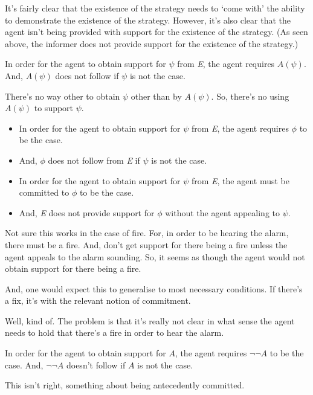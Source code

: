 \documentclass[10pt]{article}
\begin{document}
\begin{note}
  It's fairly clear that the existence of the strategy needs to `come with' the ability to demonstrate the existence of the strategy.
  However, it's also clear that the agent isn't being provided with support for the existence of the strategy.
  (As seen above, the informer does not provide support for the existence of the strategy.)

  In order for the agent to obtain support for \(\psi\) from \emph{E}, the agent requires \(A(\psi)\).
  And, \(A(\psi)\) does not follow if \(\psi\) is not the case.

  There's no way other to obtain \(\psi\) other than by \(A(\psi)\).
  So, there's no using \(A(\psi)\) to support \(\psi\).

  \begin{itemize}
  \item In order for the agent to obtain support for \(\psi\) from \emph{E}, the agent requires \(\phi\) to be the case.
  \item And, \(\phi\) does not follow from \emph{E} if \(\psi\) is not the case.
  \end{itemize}

  \begin{itemize}
  \item In order for the agent to obtain support for \(\psi\) from \emph{E}, the agent must be committed to \(\phi\) to be the case.
  \item And, \emph{E} does not provide support for \(\phi\) without the agent appealing to \(\psi\).
  \end{itemize}

  Not sure this works in the case of fire.
  For, in order to be hearing the alarm, there must be a fire.
  And, don't get support for there being a fire unless the agent appeals to the alarm sounding.
  So, it seems as though the agent would not obtain support for there being a fire.

  And, one would expect this to generalise to most necessary conditions.
  If there's a fix, it's with the relevant notion of commitment.

  Well, kind of.
  The problem is that it's really not clear in what sense the agent needs to hold that there's a fire in order to hear the alarm.

  In order for the agent to obtain support for \(A\), the agent requires \(\lnot\lnot A\) to be the case.
  And, \(\lnot\lnot A\) doesn't follow if \(A\) is not the case.

  This isn't right, something about being antecedently committed.
\end{note}
\end{document}
